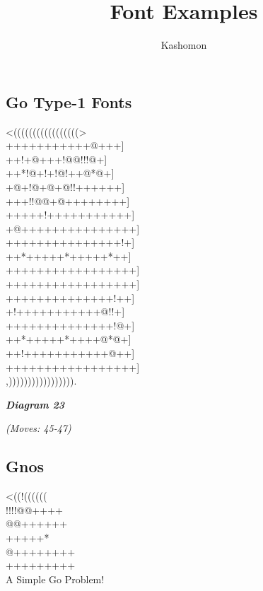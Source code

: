 \documentclass{article}
\newcommand{\subtext}[1]{\centerline{\textit{#1}}}
\begin{document}
\title{Font Examples}
\author{Kashomon}
\maketitle


\begin{center}
\section*{Go Type-1 Fonts}
\vspace{12pt}
\begin{minipage}[t]{240pt}
{\gnos%
<(((((((((((((((((>\\
+++++++++++@+++]\\
++!+@+++!@@!!!@+]\\
++*!@+!+!@!++@*@+]\\
+@+!@+@+@!!++++++]\\
+++!!@@+@++++++++]\\
+++++!+++++++++++]\\
+@+++++++++++++++]\\
+++++++++++++++!+]\\
++*+++++*+++++*++]\\
+++++++++++++++++]\\
+++++++++++++++++]\\
++++++++++++++!++]\\
+!+++++++++++@!!+]\\
++++++++++++++!@+]\\
++*+++++*++++@*@+]\\
++!+++++++++++@++]\\
+++++++++++++++++]\\
,))))))))))))))))).\\
}
\centerline{\textit{\textbf{Diagram 23}}}
\subtext{(Moves: 45-47)}
\end{minipage}
\end{center}

\newpage

\begin{center}
\section*{Gnos}
{\gnos%
<((!((((((\\
!!!!@@++++\\
@@++++++\\
+++++*\\
@++++++++\\
+++++++++\\
}
A Simple Go Problem!
\end{center}
\end{document}

